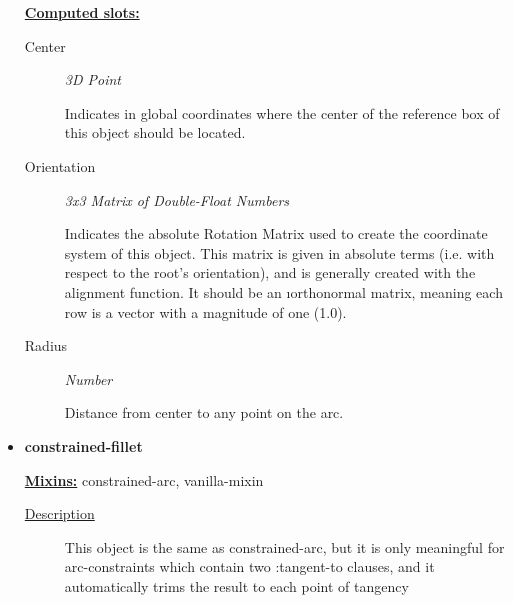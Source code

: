 \documentclass [11pt]{book}
\begin{document}
\begin{itemize}
\textbf{
\underline{Computed slots:}}

\begin{description}

\item [Center]
\emph{3D Point}

 Indicates in global coordinates where the center of the reference
box of this object should be located.




\item [Orientation]
\emph{3x3 Matrix of Double-Float Numbers}

 Indicates the absolute Rotation Matrix used to create
the coordinate system of this object. This matrix is given in absolute terms (i.e. with
respect to the root's orientation), and is generally created with the alignment function.
It should be an 
\i{orthonormal} matrix, meaning each row is a vector with a magnitude
of one (1.0).




\item [Radius]
\emph{Number}

 Distance from center to any point on the arc.




\end{description}







\item {}
\label{prim:constrained-fillet}
\textbf{constrained-fillet}


\textbf{
\underline{Mixins:}} constrained-arc, vanilla-mixin





\begin{description}

\item [
\underline{Description}]


This object is the same as constrained-arc, but it is only
meaningful for arc-constraints which contain two :tangent-to clauses,
and it automatically trims the result to each point of tangency



\end{description}









\end{itemize}
\end{document}
